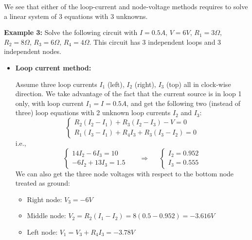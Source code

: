 \documentclass{article}
\begin{document}
We see that either of the loop-current and node-voltage methods requires 
to solve a linear system of 3 equations with 3 unknowns. 

{\bf Example 3:} Solve the following circuit with $I=0.5 A$, $V=6 V$, 
$R_1=3\Omega$, $R_2=8\Omega$, $R_3=6\Omega$, $R_4=4\Omega$. This circuit
has 3 independent loops and 3 independent nodes.


\begin{itemize}
\item {\bf Loop current method:}

  Assume three loop currents $I_1$ (left), $I_2$ (right), $I_3$ (top) all 
  in clock-wise direction. We take advantage of the fact that the current 
  source is in loop 1 only, with loop current $I_1=I=0.5A$, and get the 
  following two (instead of three) loop equations with 2 unknown loop 
  currents $I_2$ and $I_3$:
  \begin{equation} 
    \left\{ \begin{array}{l} R_2(I_2-I_1)+R_3(I_2-I_3)-V=0 \\
    R_1(I_3-I_1)+R_4I_3+R_3(I_3-I_2)=0 \end{array} \right. 
  \end{equation}
  i.e.,
  \begin{equation}
    \left\{ \begin{array}{l}
    14 I_2-6 I_3=10 \\   -6 I_2+13 I_3=1.5 \end{array} \right. 
    \;\;\;\;\;\;\Longrightarrow \;\;\;\;\;
    \left\{ \begin{array}{l}
      I_2=0.952 \\  I_3=0.555 \end{array} \right. 
  \end{equation}
  We can also get the three node voltages with respect to the bottom 
  node treated as ground: 
  \begin{itemize}
    \item Right node: $V_3=-6V$ 
    \item Middle node: $V_2=R_2(I_1-I_2)=8(0.5-0.952)=-3.616V$ 
    \item Left node: $V_1=V_3+R_4 I_3=-3.78 V$ 
  \end{itemize}


\end{itemize}
\end{document}
